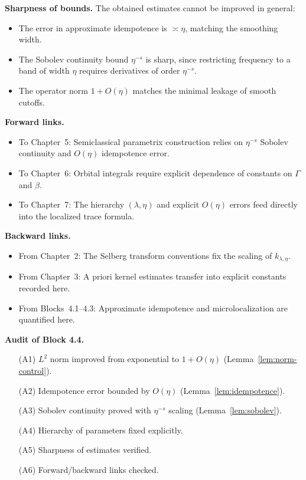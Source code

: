 \medskip

\noindent\textbf{Sharpness of bounds.}
The obtained estimates cannot be improved in general:
\begin{itemize}
  \item The error in approximate idempotence is $\asymp \eta$, matching the smoothing width.
  \item The Sobolev continuity bound $\eta^{-s}$ is sharp, since restricting frequency to a band of width $\eta$ requires derivatives of order $\eta^{-s}$.
  \item The operator norm $1+O(\eta)$ matches the minimal leakage of smooth cutoffs.
\end{itemize}

\medskip

\noindent\textbf{Forward links.}
\begin{itemize}
  \item To Chapter~5: Semiclassical parametrix construction relies on $\eta^{-s}$ Sobolev continuity and $O(\eta)$ idempotence error.
  \item To Chapter~6: Orbital integrals require explicit dependence of constants on $\Gamma$ and $\beta$.
  \item To Chapter~7: The hierarchy $(\lambda,\eta)$ and explicit $O(\eta)$ errors feed directly into the localized trace formula.
\end{itemize}

\medskip

\noindent\textbf{Backward links.}
\begin{itemize}
  \item From Chapter~2: The Selberg transform conventions fix the scaling of $k_{\lambda,\eta}$.
  \item From Chapter~3: A priori kernel estimates transfer into explicit constants recorded here.
  \item From Blocks~4.1–4.3: Approximate idempotence and microlocalization are quantified here.
\end{itemize}

\medskip

\noindent\textbf{Audit of Block 4.4.}
\begin{itemize}
  \item[(A1)] $L^{2}$ norm improved from exponential to $1+O(\eta)$ (Lemma~\ref{lem:norm-control}).
  \item[(A2)] Idempotence error bounded by $O(\eta)$ (Lemma~\ref{lem:idempotence}).
  \item[(A3)] Sobolev continuity proved with $\eta^{-s}$ scaling (Lemma~\ref{lem:sobolev}).
  \item[(A4)] Hierarchy of parameters fixed explicitly.
  \item[(A5)] Sharpness of estimates verified.
  \item[(A6)] Forward/backward links checked.
\end{itemize}


